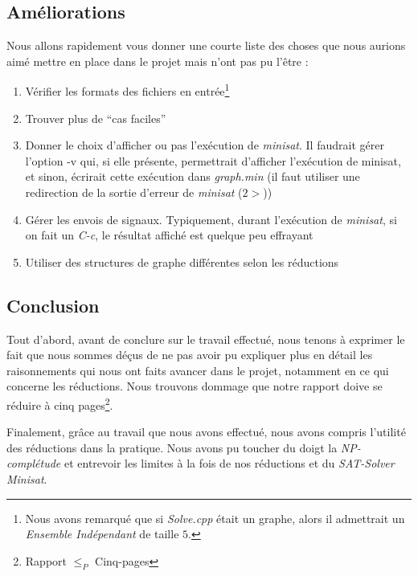   \subsection{Améliorations}
  Nous allons rapidement vous donner une courte liste des choses que
  nous aurions aimé mettre en place dans le projet mais n'ont pas pu
  l'être :
  \begin{enumerate}
   \item Vérifier les formats des fichiers en entrée\footnote{Nous avons
	 remarqué que si \emph{Solve.cpp} était un graphe, alors il
	 admettrait un \emph{Ensemble Indépendant} de taille $5$.} 
   \item Trouver plus de ``cas faciles''
   \item Donner le choix d'afficher ou pas l'exécution de
	 \emph{minisat}. Il faudrait gérer l'option -v qui, si elle
	 présente, permettrait d'afficher l'exécution de minisat, et
	 sinon, écrirait cette exécution dans \emph{graph.min} (il faut
	 utiliser une redirection de la sortie d'erreur de
	 \emph{minisat} ($2>$))
   \item Gérer les envois de signaux. Typiquement, durant l'exécution de
	 \emph{minisat}, si on fait un \emph{C-c}, le résultat affiché
	 est quelque peu effrayant
   \item Utiliser des structures de graphe différentes selon les
	 réductions
  \end{enumerate}
  
  \subsection{Conclusion}
  Tout d'abord, avant de conclure sur le travail effectué, nous tenons à
  exprimer le fait que nous sommes déçus de ne pas avoir pu expliquer
  plus en détail les raisonnements qui nous ont faits avancer dans le
  projet, notamment en ce qui concerne les réductions. Nous trouvons
  dommage que notre rapport doive se réduire à cinq
  pages\footnote{Rapport $\leq_P$ Cinq-pages}.

  Finalement, grâce au travail que nous avons effectué, nous avons
  compris l'utilité des réductions dans la pratique. Nous avons pu
  toucher du doigt la \emph{NP-complétude} et entrevoir les limites à la
  fois de nos réductions et du \emph{SAT-Solver Minisat}.